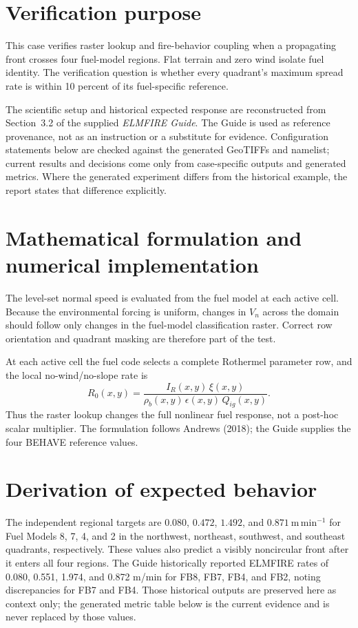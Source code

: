 \section{Verification purpose}

This case verifies raster lookup and fire-behavior coupling when a propagating front crosses four fuel-model regions.  Flat terrain and zero wind isolate fuel identity.  The verification question is whether every quadrant's maximum spread rate is within 10 percent of its fuel-specific reference.

The scientific setup and historical expected response are reconstructed from Section~3.2 of the supplied \emph{ELMFIRE Guide}. The Guide is used as reference provenance, not as an instruction or a substitute for evidence. Configuration statements below are checked against the generated GeoTIFFs and namelist; current results and decisions come only from case-specific outputs and generated metrics. Where the generated experiment differs from the historical example, the report states that difference explicitly.

\section{Mathematical formulation and numerical implementation}

The level-set normal speed is evaluated from the fuel model at each active cell.  Because the environmental forcing is uniform, changes in \(V_n\) across the domain should follow only changes in the fuel-model classification raster.  Correct row orientation and quadrant masking are therefore part of the test.

At each active cell the fuel code selects a complete Rothermel parameter row, and the local no-wind/no-slope rate is
\begin{equation}
R_0(x,y)=\frac{I_R(x,y)\,\xi(x,y)}{\rho_b(x,y)\,\epsilon(x,y)\,Q_{ig}(x,y)}.
\end{equation}
Thus the raster lookup changes the full nonlinear fuel response, not a post-hoc scalar multiplier. The formulation follows Andrews (2018); the Guide supplies the four BEHAVE reference values.

\section{Derivation of expected behavior}

The independent regional targets are \(0.080\), \(0.472\), \(1.492\), and \(0.871~\mathrm{m\,min^{-1}}\) for Fuel Models 8, 7, 4, and 2 in the northwest, northeast, southwest, and southeast quadrants, respectively.  These values also predict a visibly noncircular front after it enters all four regions. The Guide historically reported ELMFIRE rates of 0.080, 0.551, 1.974, and 0.872 m/min for FB8, FB7, FB4, and FB2, noting discrepancies for FB7 and FB4. Those historical outputs are preserved here as context only; the generated metric table below is the current evidence and is never replaced by those values.

